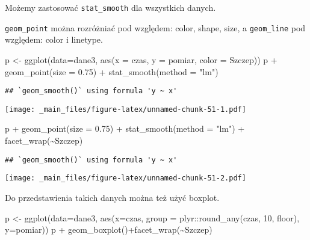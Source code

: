 \documentclass[
]{book}
\newenvironment{Shaded}{\begin{snugshade}}{\end{snugshade}}
\newcommand{\AttributeTok}[1]{\textcolor[rgb]{0.77,0.63,0.00}{#1}}
\newcommand{\DecValTok}[1]{\textcolor[rgb]{0.00,0.00,0.81}{#1}}
\newcommand{\FloatTok}[1]{\textcolor[rgb]{0.00,0.00,0.81}{#1}}
\newcommand{\FunctionTok}[1]{\textcolor[rgb]{0.00,0.00,0.00}{#1}}
\newcommand{\NormalTok}[1]{#1}
\newcommand{\OtherTok}[1]{\textcolor[rgb]{0.56,0.35,0.01}{#1}}
\newcommand{\SpecialCharTok}[1]{\textcolor[rgb]{0.00,0.00,0.00}{#1}}
\newcommand{\StringTok}[1]{\textcolor[rgb]{0.31,0.60,0.02}{#1}}
\begin{document}
Możemy zastosować \texttt{stat\_smooth} dla wszystkich danych.

\texttt{geom\_point} można rozróżniać pod względem: color, shape, size, a \texttt{geom\_line} pod względem: color i linetype.

\begin{Shaded}
\begin{Highlighting}[]
\NormalTok{p }\OtherTok{\textless{}{-}} \FunctionTok{ggplot}\NormalTok{(}\AttributeTok{data=}\NormalTok{dane3, }\FunctionTok{aes}\NormalTok{(}\AttributeTok{x =}\NormalTok{ czas, }\AttributeTok{y =}\NormalTok{ pomiar, }\AttributeTok{color =}\NormalTok{ Szczep))}
\NormalTok{p }\SpecialCharTok{+} \FunctionTok{geom\_point}\NormalTok{(}\AttributeTok{size =} \FloatTok{0.75}\NormalTok{) }\SpecialCharTok{+} \FunctionTok{stat\_smooth}\NormalTok{(}\AttributeTok{method =} \StringTok{"lm"}\NormalTok{)}
\end{Highlighting}
\end{Shaded}

\begin{verbatim}
## `geom_smooth()` using formula 'y ~ x'
\end{verbatim}

\texttt{[image: \_main\_files/figure-latex/unnamed-chunk-51-1.pdf]}

\begin{Shaded}
\begin{Highlighting}[]
\NormalTok{p }\SpecialCharTok{+} \FunctionTok{geom\_point}\NormalTok{(}\AttributeTok{size =} \FloatTok{0.75}\NormalTok{) }\SpecialCharTok{+} \FunctionTok{stat\_smooth}\NormalTok{(}\AttributeTok{method =} \StringTok{"lm"}\NormalTok{) }\SpecialCharTok{+} \FunctionTok{facet\_wrap}\NormalTok{(}\SpecialCharTok{\textasciitilde{}}\NormalTok{Szczep)}
\end{Highlighting}
\end{Shaded}

\begin{verbatim}
## `geom_smooth()` using formula 'y ~ x'
\end{verbatim}

\texttt{[image: \_main\_files/figure-latex/unnamed-chunk-51-2.pdf]}

Do przedstawienia takich danych można też użyć boxplot.

\begin{Shaded}
\begin{Highlighting}[]
\NormalTok{p }\OtherTok{\textless{}{-}} \FunctionTok{ggplot}\NormalTok{(}\AttributeTok{data=}\NormalTok{dane3, }\FunctionTok{aes}\NormalTok{(}\AttributeTok{x=}\NormalTok{czas, }\AttributeTok{group =}\NormalTok{ plyr}\SpecialCharTok{::}\FunctionTok{round\_any}\NormalTok{(czas, }\DecValTok{10}\NormalTok{, floor), }\AttributeTok{y=}\NormalTok{pomiar))}
\NormalTok{p }\SpecialCharTok{+} \FunctionTok{geom\_boxplot}\NormalTok{()}\SpecialCharTok{+}\FunctionTok{facet\_wrap}\NormalTok{(}\SpecialCharTok{\textasciitilde{}}\NormalTok{Szczep)}
\end{Highlighting}
\end{Shaded}
\end{document}
